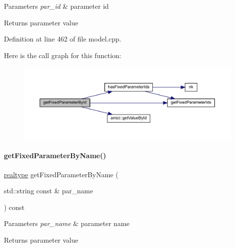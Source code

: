 \begin{DoxyParams}{Parameters}
{\em par\+\_\+id} & parameter id \\
\hline
\end{DoxyParams}
\begin{DoxyReturn}{Returns}
parameter value 
\end{DoxyReturn}


Definition at line 462 of file model.\+cpp.

Here is the call graph for this function\+:
\nopagebreak
\begin{figure}[H]
\begin{center}
\leavevmode
\includegraphics[width=350pt]{classamici_1_1_model_acc647ebbeaf0be737c7c165fa77eeca5_cgraph}
\end{center}
\end{figure}
\mbox{\label{classamici_1_1_model_a99cc00a08b2f2d87d3eac047d00a7c57}} 
\paragraph{\texorpdfstring{get\+Fixed\+Parameter\+By\+Name()}{getFixedParameterByName()}}
{\footnotesize\ttfamily \mbox{\hyperlink{namespaceamici_a1bdce28051d6a53868f7ccbf5f2c14a3}{realtype}} get\+Fixed\+Parameter\+By\+Name (\begin{DoxyParamCaption}\item[{std\+::string const \&}]{par\+\_\+name }\end{DoxyParamCaption}) const}


\begin{DoxyParams}{Parameters}
{\em par\+\_\+name} & parameter name \\
\hline
\end{DoxyParams}
\begin{DoxyReturn}{Returns}
parameter value 
\end{DoxyReturn}


